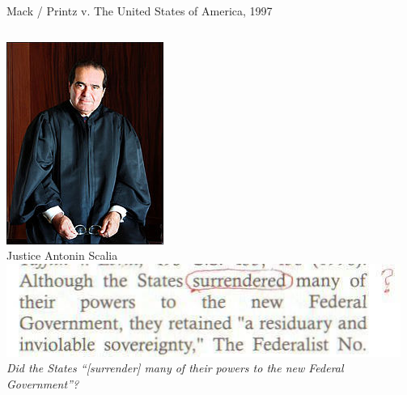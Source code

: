 \begin{frame}{Mack / Printz v. The United States of America, 1997}
    \begin{columns}[onlytextwidth]
            \centering
            \includegraphics[height=0.75\textheight]{img/scalia.jpg} \\
            Justice Antonin Scalia \\

            \includegraphics[width=\textwidth]{img/surrendered.png} \\
            \pause
            {
                \color{red}
                \emph{Did the States ``[surrender] many of their powers to the new Federal Government''?}
            }
    \end{columns}
\end{frame}

